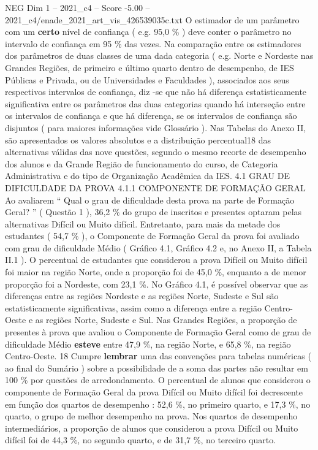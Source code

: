 \begin{textsample}{NEG Dim 1 – 2021\_c4 – Score -5.00 – 2021\_c4/enade\_2021\_art\_vis\_426539035c.txt}
O estimador de um parâmetro com um \textbf{certo} nível de confiança ( e.g. 95,0 \% ) deve conter o parâmetro no intervalo de confiança em 95 \% das vezes.
Na comparação entre os estimadores dos parâmetros de duas classes de uma dada categoria ( e.g.
Norte e Nordeste nas Grandes Regiões, de primeiro e último quarto dentro de desempenho, de IES Públicas e Privada, ou de Universidades e Faculdades ), associados aos seus respectivos intervalos de confiança, diz -se que não há diferença estatisticamente significativa entre os parâmetros das duas categorias quando há interseção entre os intervalos de confiança e que há diferença, se os intervalos de confiança são disjuntos ( para maiores informações vide Glossário ).
Nas Tabelas do Anexo II, são apresentados os valores absolutos e a distribuição percentual18 das alternativas válidas das nove questões, segundo o mesmo recorte de desempenho dos alunos e da Grande Região de funcionamento do curso, de Categoria Administrativa e do tipo de Organização Acadêmica da IES. 4.1 GRAU DE DIFICULDADE DA PROVA 4.1.1 COMPONENTE DE FORMAÇÃO GERAL Ao avaliarem “ Qual o grau de dificuldade desta prova na parte de Formação Geral? ” ( Questão 1 ), 36,2 \% do grupo de inscritos e presentes optaram pelas alternativas Difícil ou Muito difícil.
Entretanto, para mais da metade dos estudantes ( 54,7 \% ), o Componente de Formação Geral da prova foi avaliado com grau de dificuldade Médio ( Gráfico 4.1, Gráfico 4.2 e, no Anexo II, a Tabela II.1 ).
O percentual de estudantes que considerou a prova Difícil ou Muito difícil foi maior na região Norte, onde a proporção foi de 45,0 \%, enquanto a de menor proporção foi a Nordeste, com 23,1 \%.
No Gráfico 4.1, é possível observar que as diferenças entre as regiões Nordeste e as regiões Norte, Sudeste e Sul são estatisticamente significativas, assim como a diferença entre a região Centro-Oeste e as regiões Norte, Sudeste e Sul.
Nas Grandes Regiões, a proporção de presentes à prova que avaliou o Componente de Formação Geral como de grau de dificuldade Médio \textbf{esteve} entre 47,9 \%, na região Norte, e 65,8 \%, na região Centro-Oeste. 18 Cumpre \textbf{lembrar} uma das convenções para tabelas numéricas ( ao final do Sumário ) sobre a possibilidade de a soma das partes não resultar em 100 \% por questões de arredondamento.
O percentual de alunos que considerou o componente de Formação Geral da prova Difícil ou Muito difícil foi decrescente em função dos quartos de desempenho : 52,6 \%, no primeiro quarto, e 17,3 \%, no quarto, o grupo de melhor desempenho na prova.
Nos quartos de desempenho intermediários, a proporção de alunos que considerou a prova Difícil ou Muito difícil foi de 44,3 \%, no segundo quarto, e de 31,7 \%, no terceiro quarto.

\end{textsample}
